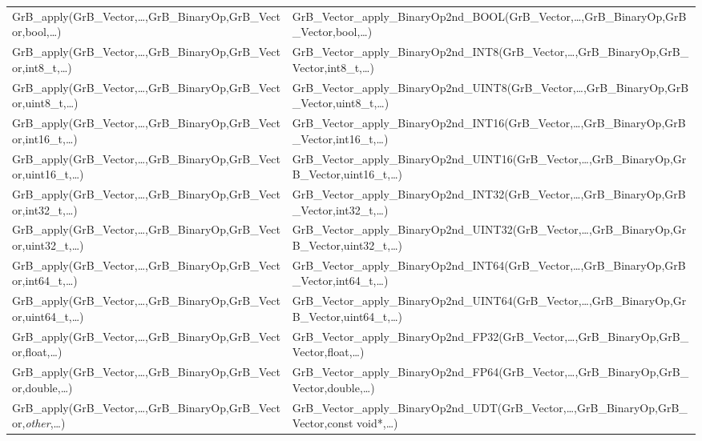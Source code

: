 \begin{landscape}
\begin{table}[htb]
{\begin{tabular}{l|l}
{\sf GrB\_apply(GrB\_Vector,\ldots,GrB\_BinaryOp,GrB\_Vector,bool,\ldots)}		& {\sf GrB\_Vector\_apply\_BinaryOp2nd\_BOOL(GrB\_Vector,\ldots,GrB\_BinaryOp,GrB\_Vector,bool,\ldots)} \\
{\sf GrB\_apply(GrB\_Vector,\ldots,GrB\_BinaryOp,GrB\_Vector,int8\_t,\ldots)}	& {\sf GrB\_Vector\_apply\_BinaryOp2nd\_INT8(GrB\_Vector,\ldots,GrB\_BinaryOp,GrB\_Vector,int8\_t,\ldots)} \\
{\sf GrB\_apply(GrB\_Vector,\ldots,GrB\_BinaryOp,GrB\_Vector,uint8\_t,\ldots)}	& {\sf GrB\_Vector\_apply\_BinaryOp2nd\_UINT8(GrB\_Vector,\ldots,GrB\_BinaryOp,GrB\_Vector,uint8\_t,\ldots)} \\
{\sf GrB\_apply(GrB\_Vector,\ldots,GrB\_BinaryOp,GrB\_Vector,int16\_t,\ldots)}	& {\sf GrB\_Vector\_apply\_BinaryOp2nd\_INT16(GrB\_Vector,\ldots,GrB\_BinaryOp,GrB\_Vector,int16\_t,\ldots)} \\
{\sf GrB\_apply(GrB\_Vector,\ldots,GrB\_BinaryOp,GrB\_Vector,uint16\_t,\ldots)}	& {\sf GrB\_Vector\_apply\_BinaryOp2nd\_UINT16(GrB\_Vector,\ldots,GrB\_BinaryOp,GrB\_Vector,uint16\_t,\ldots)} \\
{\sf GrB\_apply(GrB\_Vector,\ldots,GrB\_BinaryOp,GrB\_Vector,int32\_t,\ldots)}	& {\sf GrB\_Vector\_apply\_BinaryOp2nd\_INT32(GrB\_Vector,\ldots,GrB\_BinaryOp,GrB\_Vector,int32\_t,\ldots)} \\
{\sf GrB\_apply(GrB\_Vector,\ldots,GrB\_BinaryOp,GrB\_Vector,uint32\_t,\ldots)}	& {\sf GrB\_Vector\_apply\_BinaryOp2nd\_UINT32(GrB\_Vector,\ldots,GrB\_BinaryOp,GrB\_Vector,uint32\_t,\ldots)} \\
{\sf GrB\_apply(GrB\_Vector,\ldots,GrB\_BinaryOp,GrB\_Vector,int64\_t,\ldots)}	& {\sf GrB\_Vector\_apply\_BinaryOp2nd\_INT64(GrB\_Vector,\ldots,GrB\_BinaryOp,GrB\_Vector,int64\_t,\ldots)} \\
{\sf GrB\_apply(GrB\_Vector,\ldots,GrB\_BinaryOp,GrB\_Vector,uint64\_t,\ldots)}	& {\sf GrB\_Vector\_apply\_BinaryOp2nd\_UINT64(GrB\_Vector,\ldots,GrB\_BinaryOp,GrB\_Vector,uint64\_t,\ldots)} \\
{\sf GrB\_apply(GrB\_Vector,\ldots,GrB\_BinaryOp,GrB\_Vector,float,\ldots)}		& {\sf GrB\_Vector\_apply\_BinaryOp2nd\_FP32(GrB\_Vector,\ldots,GrB\_BinaryOp,GrB\_Vector,float,\ldots)} \\
{\sf GrB\_apply(GrB\_Vector,\ldots,GrB\_BinaryOp,GrB\_Vector,double,\ldots)}	& {\sf GrB\_Vector\_apply\_BinaryOp2nd\_FP64(GrB\_Vector,\ldots,GrB\_BinaryOp,GrB\_Vector,double,\ldots)} \\
{\sf GrB\_apply(GrB\_Vector,\ldots,GrB\_BinaryOp,GrB\_Vector,\emph{other},\ldots)}		& {\sf GrB\_Vector\_apply\_BinaryOp2nd\_UDT(GrB\_Vector,\ldots,GrB\_BinaryOp,GrB\_Vector,const void*,\ldots)} \\
\hline
\end{tabular}
}
\label{Tab:NonPolymorphic5a}
\end{table}


\end{landscape}
